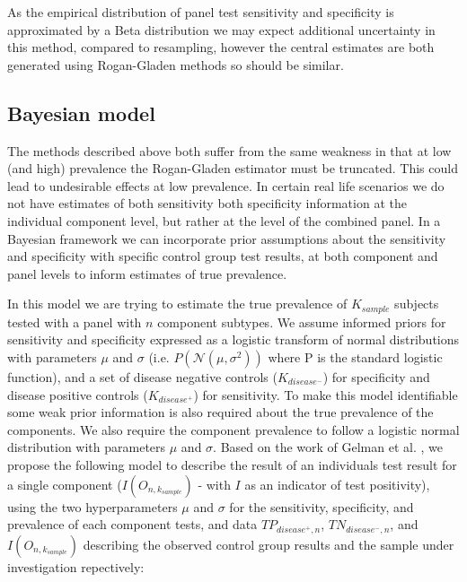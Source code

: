 \documentclass[a4paper, 12pt, twoside]{article}
\let\Oldsubsection\subsection
\renewcommand{\subsection}{\FloatBarrier\Oldsubsection}
\begin{document}
As the empirical distribution of panel test sensitivity and specificity is approximated by a Beta distribution we may expect additional uncertainty in this method, compared to resampling, however the central estimates are both generated using Rogan-Gladen methods so should be similar.

\subsection{Bayesian model}

The methods described above both suffer from the same weakness in that at low (and high) prevalence the Rogan-Gladen estimator must be truncated. This could lead to undesirable effects at low prevalence. In certain real life scenarios we do not have estimates of both sensitivity both specificity information at the individual component level, but rather at the level of the combined panel. In a Bayesian framework we can incorporate prior assumptions about the sensitivity and specificity with specific control group test results, at both component and panel levels to inform estimates of true prevalence. 

In this model we are trying to estimate the true prevalence of \(K_{sample}\) subjects tested with a panel with \(n\) component subtypes. We assume informed priors for sensitivity and specificity expressed as a logistic transform of normal distributions with parameters \(\mu\) and \(\sigma\) (i.e. \(P(\mathcal{N}(\mu,\sigma^2))\) where P is the standard logistic function), and a set of disease negative controls (\(K_{disease^-}\)) for specificity and disease positive controls (\(K_{disease^+}\)) for sensitivity. To make this model identifiable some weak prior information is also required about the true prevalence of the components. We also require the component prevalence to follow a logistic normal distribution with parameters \(\mu\) and \(\sigma\). Based on the work of Gelman et al. \cite{gelman2020}, we propose the following model to describe the result of an individuals test result for a single component (\(I(O_{n,k_{sample}})\) - with \(I\) as an indicator of test positivity), using the two hyperparameters \(\mu\) and \(\sigma\) for the sensitivity, specificity, and prevalence of each component tests, and data \(TP_{disease^+,n}\), \(TN_{disease^-,n}\), and \(I(O_{n,k_{sample}})\) describing the observed control group results and the sample under investigation repectively:
\end{document}
